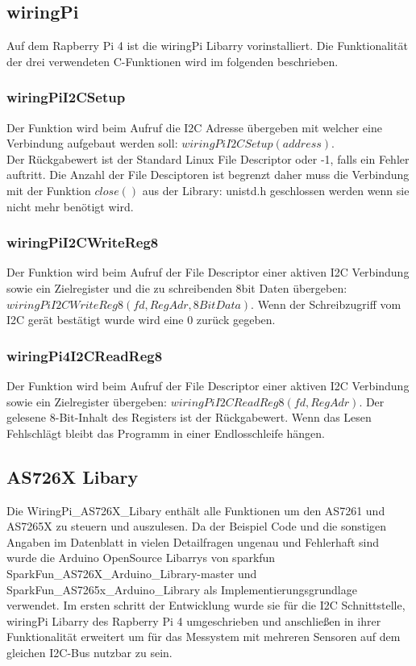 \subsection{wiringPi}
Auf dem Rapberry Pi 4 ist die  wiringPi Libarry vorinstalliert. 
Die Funktionalität der drei verwendeten C-Funktionen wird im folgenden beschrieben.

\subsubsection{wiringPiI2CSetup}
Der Funktion wird beim Aufruf die I2C Adresse übergeben mit welcher eine Verbindung aufgebaut werden soll: $wiringPiI2CSetup(address)$.\\
Der Rückgabewert ist der Standard Linux File Descriptor oder -1, falls ein Fehler auftritt. 
Die Anzahl der File Desciptoren ist begrenzt daher muss die Verbindung mit der Funktion $close()$ aus der Library: unistd.h geschlossen werden wenn sie nicht mehr benötigt wird.

\subsubsection{wiringPiI2CWriteReg8}
Der Funktion wird beim Aufruf der File Descriptor einer aktiven I2C Verbindung sowie ein Zielregister und die zu schreibenden 8bit Daten übergeben:\\ $wiringPiI2CWriteReg8 (fd, RegAdr, 8BitData)$.
Wenn der Schreibzugriff vom I2C gerät bestätigt wurde wird eine 0 zurück gegeben.
\subsubsection{wiringPi4I2CReadReg8}
Der Funktion wird beim Aufruf der File Descriptor einer aktiven I2C Verbindung sowie ein Zielregister übergeben: $wiringPiI2CReadReg8(fd, RegAdr)$.
Der gelesene 8-Bit-Inhalt des Registers ist der Rückgabewert.
Wenn das Lesen Fehlschlägt bleibt das Programm in einer Endlosschleife hängen.

\subsection{AS726X Libary}
Die WiringPi\_AS726X\_Libary enthält alle Funktionen um den AS7261 und AS7265X zu steuern und auszulesen.
Da der Beispiel Code und die sonstigen Angaben im Datenblatt in vielen Detailfragen ungenau und Fehlerhaft sind wurde die Arduino OpenSource Libarrys von sparkfun SparkFun\_AS726X\_Arduino\_Library-master und SparkFun\_AS7265x\_Arduino\_Library als Implementierungsgrundlage verwendet.
Im ersten schritt der Entwicklung wurde sie für die I2C Schnittstelle, wiringPi Libarry des Rapberry Pi 4 umgeschrieben und anschließen in ihrer Funktionalität erweitert um für das Messystem mit mehreren Sensoren auf dem gleichen I2C-Bus nutzbar zu sein. \\

